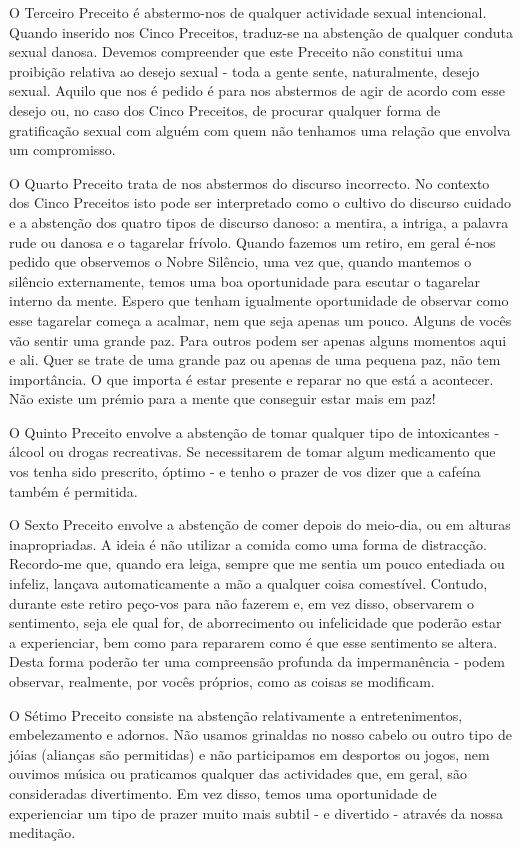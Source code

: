 O Terceiro Preceito é abstermo-nos de qualquer actividade sexual
intencional. Quando inserido nos Cinco Preceitos, traduz-se na abstenção
de qualquer conduta sexual danosa. Devemos compreender que este Preceito
não constitui uma proibição relativa ao desejo sexual - toda a gente
sente, naturalmente, desejo sexual. Aquilo que nos é pedido é para nos
abstermos de agir de acordo com esse desejo ou, no caso dos Cinco
Preceitos, de procurar qualquer forma de gratificação sexual com alguém
com quem não tenhamos uma relação que envolva um compromisso.

O Quarto Preceito trata de nos abstermos do discurso incorrecto. No
contexto dos Cinco Preceitos isto pode ser interpretado como o cultivo
do discurso cuidado e a abstenção dos quatro tipos de discurso danoso: a
mentira, a intriga, a palavra rude ou danosa e o tagarelar frívolo.
Quando fazemos um retiro, em geral é-nos pedido que observemos o Nobre
Silêncio, uma vez que, quando mantemos o silêncio externamente, temos
uma boa oportunidade para escutar o tagarelar interno da mente. Espero
que tenham igualmente oportunidade de observar como esse tagarelar
começa a acalmar, nem que seja apenas um pouco. Alguns de vocês vão
sentir uma grande paz. Para outros podem ser apenas alguns momentos aqui
e ali. Quer se trate de uma grande paz ou apenas de uma pequena paz, não
tem importância. O que importa é estar presente e reparar no que está a
acontecer. Não existe um prémio para a mente que conseguir estar mais em
paz!

O Quinto Preceito envolve a abstenção de tomar qualquer tipo de
intoxicantes - álcool ou drogas recreativas. Se necessitarem de tomar
algum medicamento que vos tenha sido prescrito, óptimo - e tenho o
prazer de vos dizer que a cafeína também é permitida.

O Sexto Preceito envolve a abstenção de comer depois do \mbox{meio-dia}, ou em
alturas inapropriadas. A ideia é não utilizar a comida como uma forma de
distracção. Recordo-me que, quando era leiga, sempre que me sentia um
pouco entediada ou infeliz, lançava automaticamente a mão a qualquer
coisa comestível. Contudo, durante este retiro peço-vos para não fazerem
e, em vez disso, observarem o sentimento, seja ele qual for, de
aborrecimento ou infelicidade que poderão estar a experienciar, bem como
para repararem como é que esse sentimento se altera. Desta forma poderão
ter uma compreensão profunda da impermanência - podem observar,
realmente, por vocês próprios, como as coisas se modificam.

O Sétimo Preceito consiste na abstenção relativamente a entretenimentos,
embelezamento e adornos. Não usamos grinaldas no nosso cabelo ou outro
tipo de jóias (alianças são permitidas) e não participamos em desportos
ou jogos, nem ouvimos música ou praticamos qualquer das actividades que,
em geral, são consideradas divertimento. Em vez disso, temos uma
oportunidade de experienciar um tipo de prazer muito mais subtil - e
divertido - através da nossa meditação.

